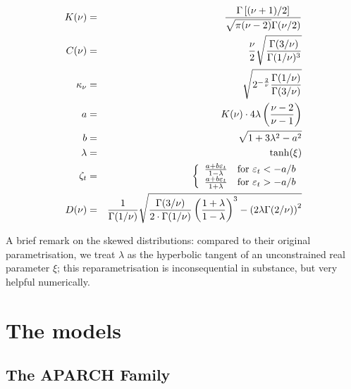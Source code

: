 \documentclass[a4paper,11pt]{article}
\newcommand{\stdu}{\ensuremath \varepsilon}
\begin{document}
\begin{table}[hptb]
  \begin{small}
\begin{eqnarray*}
  K(\nu) & = &
  \frac{\Gamma\left[(\nu + 1)/2\right]}  {\sqrt{\pi (\nu - 2)}\Gamma(\nu/2)} \\
  C(\nu) & = &
  \frac{\nu}{2}\sqrt{\frac{\Gamma(3/\nu)}{\Gamma(1/\nu)^3}} \\
  \kappa_\nu & = &
  \sqrt{2^{-\frac{2}{\nu}}\frac{\Gamma(1/\nu)}{\Gamma(3/\nu)}} \\
  a & = & K(\nu) \cdot 4 \lambda  \left( \frac{\nu - 2}{\nu - 1} \right) \\
  b & = & \sqrt{1 + 3\lambda^2 - a^2} \\
  \lambda & = & \tanh(\xi) \\
  \zeta_t & = & \left\{
    \begin{array}{ll}
        \frac{a + b \stdu_t}{1-\lambda} & \mathrm{for\ } \stdu_t < -a/b \\
        \frac{a + b \stdu_t}{1+\lambda} & \mathrm{for\ } \stdu_t > -a/b
      \end{array}
      \right. \\
  D(\nu) & = &
  \frac{1}{\Gamma(1/\nu)}\sqrt{\frac{\Gamma(3/\nu)}{2 \cdot \Gamma(1/\nu)}
  \left(\frac{1 + \lambda}{1 - \lambda}\right)^3 -
  \left(2 \lambda \Gamma(2/\nu)\right)^2 }
\end{eqnarray*}
    
  \end{small}
  \caption{Conditional densities for $\stdu_t$}
  \label{tab:densities}
\end{table}

A brief remark on the skewed distributions: compared to their original
parametrisation, we treat $\lambda$ as the hyperbolic tangent of an
unconstrained real parameter $\xi$; this reparametrisation is
inconsequential in substance, but very helpful numerically.

\section{The models}
\label{sec:models}

\subsection{The APARCH Family}
\label{sec:APARCH}
\end{document}
